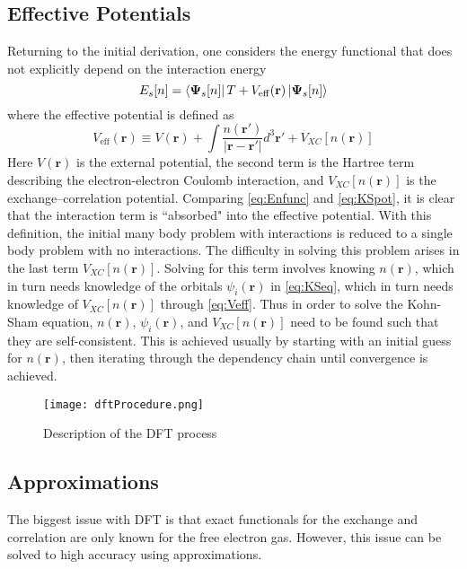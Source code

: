 \documentclass[12pt]{article}
\begin{document}
\subsection{Effective Potentials} %
Returning to the initial derivation, one considers the energy functional that does not explicitly depend on the interaction energy 
\begin{equation}\label{eq:KSpot}
    E_s[n] = \bra{\boldsymbol{\Psi}_s[n]}T+V_{\mathrm{eff}}(\textbf{r})\ket{\boldsymbol{\Psi}_s[n]} 
\end{equation}
where the effective potential is defined as 
\begin{equation}\label{eq:Veff}
    V_{\mathrm{eff}}(\textbf{r}) \equiv V(\textbf{r}) + \int \frac{n(\textbf{r}')}{|\textbf{r}-\textbf{r}'|}d^3\textbf{r}' + V_{XC}[n(\textbf{r})]
\end{equation}
Here $V(\textbf{r})$ is the external potential, the second term is the Hartree term describing the electron-electron Coulomb interaction, and $V_{XC}[n(\textbf{r})]$ is the exchange–correlation potential. Comparing \eqref{eq:Enfunc} and \eqref{eq:KSpot}, it is clear that the interaction term is ``absorbed" into the effective potential. With this definition, the initial many body problem with interactions is reduced to a single body problem with no interactions. The difficulty in solving this problem arises in the last term $V_{XC}[n(\textbf{r})]$. Solving for this term involves knowing $n(\textbf{r})$, which in turn needs knowledge of the orbitals $\psi_i(\textbf{r})$ in \eqref{eq:KSeq}, which in turn needs knowledge of $V_{XC}[n(\textbf{r})]$ through \eqref{eq:Veff}. Thus in order to solve the Kohn-Sham equation, $n(\textbf{r})$, $\psi_i(\textbf{r})$, and $V_{XC}[n(\textbf{r})]$ need to be found such that they are self-consistent. This is achieved usually by starting with an initial guess for $n(\textbf{r})$, then iterating through the dependency chain until convergence is achieved.

\begin{figure}
    \centering
    \texttt{[image: dftProcedure.png]}
    \caption{Description of the DFT process \cite{dftProcedure}}
    \label{fig:dftflowchart}
\end{figure}

\newpage
\subsection{Approximations}\label{sec:XCapprox} %
The biggest issue with DFT is that exact functionals for the exchange and correlation are only known for the free electron gas. However, this issue can be solved to high accuracy using approximations. 
\end{document}

